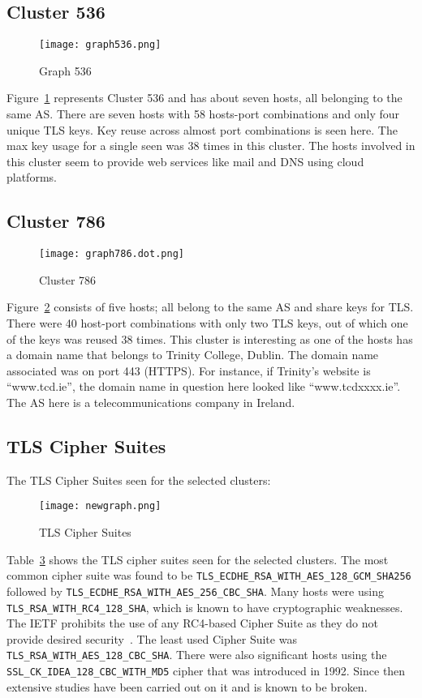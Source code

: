 \subsection{Cluster 536}
\begin{figure}[h!]
    \centering
    \texttt{[image: graph536.png]}
    \caption{Graph 536}
    \label{fig:cluster536}
\end{figure}
\noindent Figure~\ref{fig:cluster536} represents Cluster 536 and has about seven hosts, all belonging to the same AS. There are seven hosts with 58 
hosts-port combinations and only four unique TLS keys. Key reuse across almost port combinations is seen here. The max key usage for a single seen 
was 38 times in this cluster. The hosts involved in this cluster seem to provide web services like mail and DNS using cloud platforms.
\pagebreak

\subsection{Cluster 786}
\begin{figure}[h!]
    \centering
    \texttt{[image: graph786.dot.png]}
    \caption{Cluster 786}
    \label{fig:cluster786}
\end{figure}
\noindent Figure~\ref*{fig:cluster786} consists of five hosts; all belong to the same AS and share keys for TLS. There were 40 host-port combinations 
with only two TLS keys, out of which one of the keys was reused 38 times. This cluster is interesting as one of the hosts has a domain name that belongs to 
Trinity College, Dublin. The domain name associated was on port 443 (HTTPS). For instance, if Trinity's website is ``www.tcd.ie'', the 
domain name in question here looked like ``www.tcdxxxx.ie''. The AS here is a telecommunications company in Ireland. 
\pagebreak

\subsection{TLS Cipher Suites}
The TLS Cipher Suites seen for the selected clusters:
\begin{figure}[h!]
    \centering
    \texttt{[image: newgraph.png]}
    \caption{TLS Cipher Suites}
    \label{fig:tlsciphers}
\end{figure}

\noindent Table~\ref*{fig:tlsciphers} shows the TLS cipher suites seen for the selected clusters. The most common cipher suite was found to be \verb|TLS_ECDHE_RSA_WITH_AES_128_GCM_SHA256| followed by 
\verb|TLS_ECDHE_RSA_WITH_AES_256_CBC_SHA|. Many hosts were using \verb|TLS_RSA_WITH_RC4_128_SHA|, which is known to have cryptographic weaknesses. The IETF prohibits the 
use of any RC4-based Cipher Suite as they do not provide desired security~\cite{rfc7465}. The least used Cipher Suite was \verb|TLS_RSA_WITH_AES_128_CBC_SHA|.
There were also significant hosts using the \verb|SSL_CK_IDEA_128_CBC_WITH_MD5| cipher that was introduced in 1992. Since then extensive studies have 
been carried out on it and is known to be broken.~\cite{rfc6151}
\newpage

